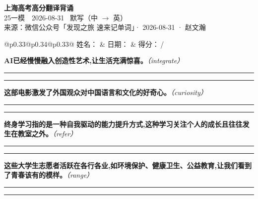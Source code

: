 \documentclass[11pt,a4paper]{article}
\newcommand{\num}[1]{\makebox[1.9em][r]{#1.}\hspace{0.3em}}
\newcommand{\wline}{\noindent\rule{\linewidth}{0.4pt}}
\newcommand{\prompt}[1]{\emph{\textcolor{tipblue}{\small（#1）}}}
\begin{document}
\pagestyle{plain}
\begin{center}
{\LARGE\bfseries 上海高考高分翻译背诵 }\\[0.25em]
{\large 25一模　2026-08-31 \quad\ 默写（中 $\to$ 英）}\\[0.35em]
{\footnotesize 来源：微信公众号「发现之旅 速来记单词」· 2026-08-31 · 赵文瀚}
\end{center}

\vspace{0.4em}
\noindent\begin{tabular}{@{}p{0.33\textwidth}@{}p{0.34\textwidth}@{}p{0.33\textwidth}@{}}
姓名：\underline{\hspace{2.0cm}} & 日期：\underline{\hspace{2.0cm}} & 得分：\underline{\hspace{1.4cm}}\,/ \\
\end{tabular}

\vspace{0.5em}

\vspace{0.8em}
\num{1}\textbf{AI已经慢慢融入创造性艺术,让生活充满惊喜。}\prompt{integrate}

\vspace{0.3em}

\wline\vspace{0.3em}
\wline

\num{2}\textbf{这部电影激发了外国观众对中国语言和文化的好奇心。}\prompt{curiosity}

\vspace{0.3em}

\wline\vspace{0.3em}
\wline

\num{3}\textbf{终身学习指的是一种自我驱动的能力提升方式,这种学习关注个人的成长且往往发生在教室之外。}\prompt{refer}

\vspace{0.3em}

\wline\vspace{0.3em}
\wline

\num{4}\textbf{这些大学生志愿者活跃在各行各业,如环境保护、健康卫生、公益教育,让我们看到了青春该有的模样。}\prompt{range}

\vspace{0.3em}

\wline\vspace{0.3em}
\wline
\end{document}
